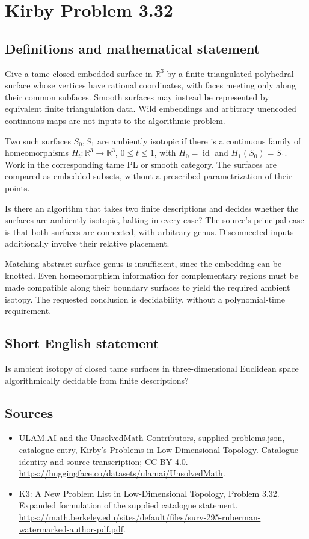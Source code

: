\documentclass[11pt,a4paper]{article}
\begin{document}
\section*{Kirby Problem 3.32}\label{statement}

\subsection{Definitions and mathematical statement}
Give a tame closed embedded surface in $\mathbb R^3$ by a finite triangulated
polyhedral surface whose vertices have rational coordinates, with faces
meeting only along their common subfaces. Smooth surfaces may instead be
represented by equivalent finite triangulation data. Wild embeddings and
arbitrary unencoded continuous maps are not inputs to the algorithmic problem.

Two such surfaces $S_0,S_1$ are ambiently isotopic if there is a continuous
family of homeomorphisms $H_t:\mathbb R^3\to\mathbb R^3$, $0\leq t\leq1$,
with $H_0=\operatorname{id}$ and $H_1(S_0)=S_1$. Work in the corresponding
tame PL or smooth category. The surfaces are compared as embedded subsets,
without a prescribed parametrization of their points.

Is there an algorithm that takes two finite descriptions and decides whether
the surfaces are ambiently isotopic, halting in every case? The source's
principal case is that both surfaces are connected, with arbitrary genus.
Disconnected inputs additionally involve their relative placement.

Matching abstract surface genus is insufficient, since the embedding can
be knotted. Even homeomorphism information for complementary regions must
be made compatible along their boundary surfaces to yield the required
ambient isotopy. The requested conclusion is decidability, without a
polynomial-time requirement.
\subsection{Short English statement}
Is ambient isotopy of closed tame surfaces in three-dimensional Euclidean space algorithmically decidable from finite descriptions?
\subsection{Sources}
\begin{itemize}
\item[S1] ULAM.AI and the UnsolvedMath Contributors, supplied problems.json, catalogue entry, Kirby's Problems in Low-Dimensional Topology. Catalogue identity and source transcription; CC BY 4.0.
\url{https://huggingface.co/datasets/ulamai/UnsolvedMath}.
\item[S2] K3: A New Problem List in Low-Dimensional Topology, Problem 3.32. Expanded formulation of the supplied catalogue statement.
\url{https://math.berkeley.edu/sites/default/files/surv-295-ruberman-watermarked-author-pdf.pdf}.
\end{itemize}
\end{document}
